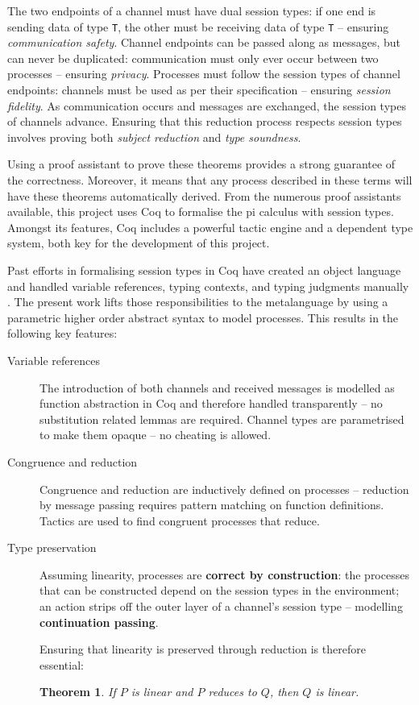 \documentclass{mproj}
\newtheorem{theorem}{Theorem}
\begin{document}
The two endpoints of a channel must have dual session types: if one end is
sending data of type \texttt{T}, the other must be receiving data of type
\texttt{T} -- ensuring \textit{communication safety}. Channel endpoints can be
passed along as messages, but can never be duplicated: communication must only
ever occur between two processes -- ensuring \textit{privacy}.  Processes must
follow the session types of channel endpoints: channels must be used as per
their specification -- ensuring \textit{session fidelity}. As communication
occurs and messages are exchanged, the session types of channels advance.
Ensuring that this reduction process respects session types involves proving
both \textit{subject reduction} and \textit{type soundness}. \cite{Dardha2016m}

Using a proof assistant to prove these theorems provides a strong guarantee of
the correctness. Moreover, it means that any process described in these terms
will have these theorems automatically derived. From the numerous proof
assistants available, this project uses Coq to formalise the pi calculus with
session types. Amongst its features, Coq includes a powerful tactic engine and a
dependent type system, both key for the development of this project.

Past efforts in formalising session types in Coq have created an object language
and handled variable references, typing contexts, and typing judgments manually
\cite{Dilmore2019}. The present work lifts those responsibilities to the
metalanguage by using a parametric higher order abstract syntax to model
processes. This results in the following key features:

\begin{description}
    \item [Variable references]
        The introduction of both channels and received messages is modelled as
        function abstraction in Coq and therefore handled transparently -- no
        substitution related lemmas are required. Channel types are parametrised
        to make them opaque -- no cheating is allowed.

    \item [Congruence and reduction]
        Congruence and reduction are inductively defined on processes --
        reduction by message passing requires pattern matching on function
        definitions. Tactics are used to find congruent processes that reduce.

    \item [Type preservation]
        Assuming linearity, processes are \textbf{correct by construction}:
        the processes that can be constructed depend on the session types in the
        environment; an action strips off the outer layer of a channel's session
        type -- modelling \textbf{continuation passing}.

        Ensuring that linearity is preserved through reduction is therefore
        essential:
        \begin{theorem}
        If $P$ is linear and $P$ reduces to $Q$, then $Q$ is linear.
        \end{theorem}
\end{description}




\end{document}
